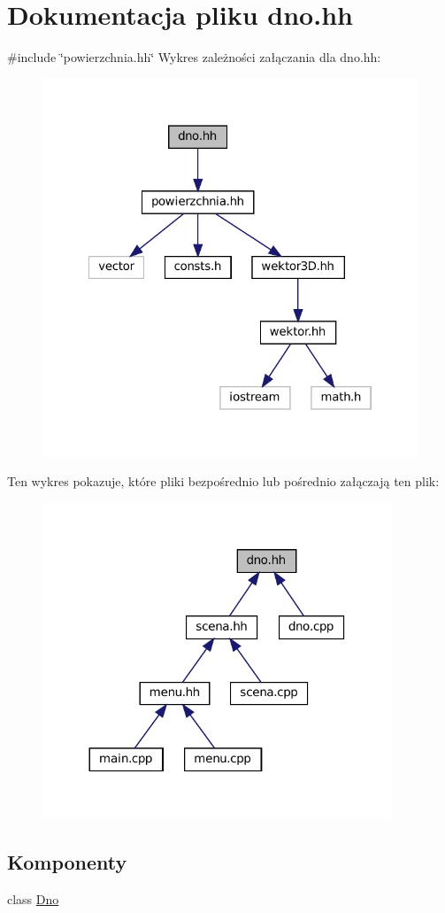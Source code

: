\hypertarget{dno_8hh}{}\section{Dokumentacja pliku dno.\+hh}
\label{dno_8hh}
{\ttfamily \#include \char`\"{}powierzchnia.\+hh\char`\"{}}\newline
Wykres zależności załączania dla dno.\+hh\+:\nopagebreak
\begin{figure}[H]
\begin{center}
\leavevmode
\includegraphics[width=322pt]{dno_8hh__incl}
\end{center}
\end{figure}
Ten wykres pokazuje, które pliki bezpośrednio lub pośrednio załączają ten plik\+:
\nopagebreak
\begin{figure}[H]
\begin{center}
\leavevmode
\includegraphics[width=296pt]{dno_8hh__dep__incl}
\end{center}
\end{figure}
\subsection*{Komponenty}
\begin{DoxyCompactItemize}
\item 
class \mbox{\hyperlink{class_dno}{Dno}}
\end{DoxyCompactItemize}
